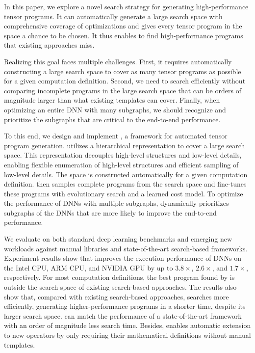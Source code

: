 In this paper, we explore a novel search strategy for generating high-performance tensor programs.
It can automatically generate a large search space with comprehensive coverage of optimizations and gives every tensor program in the space a chance to be chosen. 
It thus enables to find high-performance programs that existing approaches miss.

Realizing this goal faces multiple challenges.
First, it requires automatically constructing a large search space to cover as many tensor programs as possible for a given computation definition.
Second, we need to search efficiently without comparing incomplete programs in the large search space that can be orders of magnitude larger than what existing templates can cover.
Finally, when optimizing an entire DNN with many subgraphs, we should recognize and prioritize the subgraphs that are critical to the end-to-end performance.

To this end, we design and implement \emph{\Ansor}, a framework for automated tensor program generation.
\Ansor utilizes a hierarchical representation to cover a large search space.
This representation decouples high-level structures and low-level details, enabling flexible enumeration of high-level structures and efficient sampling of low-level details.
The space is constructed automatically for a given computation definition.
\Ansor then samples complete programs from the search space and fine-tunes these programs with evolutionary search and a learned cost model.
To optimize the performance of DNNs with multiple subgraphs, 
\Ansor dynamically prioritizes subgraphs of the DNNs that are more likely to improve the end-to-end performance.


We evaluate \Ansor on both standard deep learning benchmarks and emerging new workloads against manual libraries and state-of-the-art search-based frameworks.
Experiment results show that \Ansor improves the execution performance of DNNs on the Intel CPU, ARM CPU, and NVIDIA GPU by up to  $3.8\times$, $2.6\times$, and $1.7\times$, respectively.
For most computation definitions, the best program found by \Ansor is outside the search space of existing search-based approaches.
The results also show that, compared with existing search-based approaches, \Ansor searches more efficiently, generating higher-performance programs in a shorter time, despite its larger search space.
\Ansor can match the performance of a state-of-the-art framework with an order of magnitude less search time.
Besides, \Ansor enables automatic extension to new operators by only requiring their mathematical definitions without manual templates.

